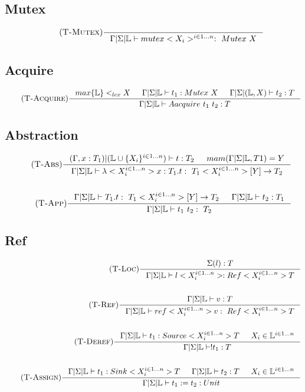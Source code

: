 \documentclass[12pt]{article}
\def\lock {\mathbb{L}}
\begin{document}
\subsection{Mutex}
\begin{align*}
    \tag {\textsc{T-Mutex}}
    \inference[]{
        }{\Gamma|\Sigma|\lock \vdash mutex<X_i>^{i\in 1...n} :~Mutex~X}
\end{align*}

\subsection{Acquire}
\begin{align*}
\tag{\textsc{T-Acquire}}
\inference[]{max\{\lock\}<_{lex}X & \Gamma|\Sigma|\lock \vdash t_1:Mutex~X 
& \Gamma|\Sigma|(\lock,X) \vdash t_2:T}{\Gamma|\Sigma|\lock \vdash Aacquire~t_1~t_2:T}
\end{align*}

\subsection{Abstraction}
\begin{align*}
\tag {\textsc{T-Abs}}
\inference[]{
    (\Gamma,x:T_1)|(\lock\cup\{X_i\}^{i\in 1...n}) \vdash t:T_2 & mam(\Gamma|\Sigma|\lock,T1) = Y
    }{\Gamma|\Sigma|\lock \vdash \lambda<X_i^{i\in 1...n}> x:T_1.t :~T_1<X_i^{i\in 1...n}>[Y]\rightarrow T_2}
    \\
    \\
    \tag {\textsc{T-App}}
\inference[]{
    \Gamma|\Sigma|\lock \vdash T_1.t :~T_1<X_i^{i\in 1...n}>[Y]\rightarrow T_2 & \Gamma|\Sigma|\lock \vdash t_2:T_1 
    }{\Gamma|\Sigma|\lock \vdash t_1\ t_2:~T_2}
\end{align*}

\subsection{Ref}
\begin{align*}
    \tag {\textsc{T-Loc}}
    \inference[]{\Sigma(l):T}{\Gamma|\Sigma|\lock \vdash l<X_i^{i\in 1...n}>:Ref<X_i^{i\in 1...n}>T}
    \\
    \\
    \tag {\textsc{T-Ref}}
    \inference[]{\Gamma|\Sigma|\lock \vdash v:T}{\Gamma|\Sigma|\lock \vdash ref<X_i^{i\in 1...n}> v:~Ref<X_i^{i\in 1...n}>T}
    \\
    \\
    \tag {\textsc{T-Deref}}
    \inference[]{\Gamma|\Sigma|\lock \vdash t_1:Source<X_i^{i\in 1...n}>T & X_i\in \lock^{i\in 1...n}}{\Gamma|\Sigma|\lock\vdash !t_1:T}
    \\
    \\
    \tag {\textsc{T-Assign}}
    \inference[]{\Gamma|\Sigma|\lock \vdash t_1:Sink<X_i^{i\in 1...n}>T & \Gamma|\Sigma|\lock \vdash t_2:T & X_i\in \lock^{i\in 1...n}}{\Gamma|\Sigma|\lock\vdash t_1 := t_2:Unit}
\end{align*}
\end{document}
